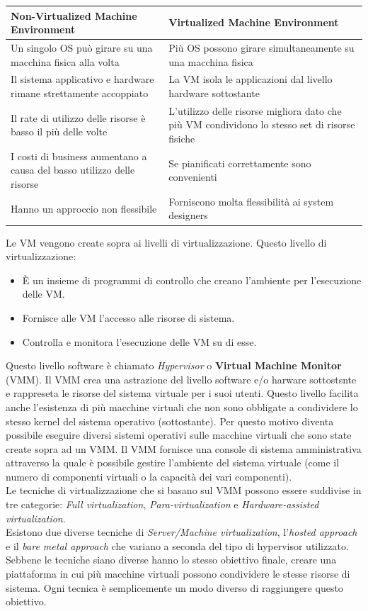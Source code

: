 \documentclass{article}
\begin{document}
\begin{table}[H]
    \begin{tabularx}{\linewidth}{X | X}
    \hline
    \textbf{Non-Virtualized Machine Environment} & \textbf{Virtualized Machine Environment}\\ [0.5ex]
    \hline\hline
    Un singolo OS può girare su una macchina fisica alla volta &
    Più OS possono girare simultaneamente su una macchina fisica \\
    \hline
    Il sistema applicativo e hardware rimane strettamente accoppiato &
    La VM isola le applicazioni dal livello hardware sottostante \\
    \hline
    Il rate di utilizzo delle risorse è basso il più delle volte & 
    L'utilizzo delle risorse migliora dato che più VM condividono lo stesso set di risorse fisiche \\
    \hline
    I costi di business aumentano a causa del basso utilizzo delle risorse & Se pianificati correttamente sono convenienti \\
    \hline
    Hanno un approccio non flessibile & 
    Forniscono molta flessibilità ai system designers\\ [1ex] 
    \hline
    \end{tabularx}
\end{table}
Le VM vengono create sopra ai livelli di virtualizzazione. Questo livello di virtualizzazione:
\begin{itemize}
    \item È un insieme di programmi di controllo che creano l'ambiente per l'esecuzione delle VM.
    \item Fornisce alle VM l'accesso alle risorse di sistema.
    \item Controlla e monitora l'esecuzione delle VM su di esse. 
\end{itemize}
Questo livello software è chiamato \textit{Hypervisor} o \textbf{Virtual Machine Monitor} (VMM). Il VMM crea una astrazione del livello software e/o harware sottostsnte e rappreseta le risorse del sistema virtuale per i suoi utenti. Questo livello facilita anche l’esistenza di più macchine virtuali che non sono obbligate a condividere lo stesso kernel del sistema operativo (sottostante). Per questo motivo diventa possibile eseguire diversi sistemi operativi sulle macchine virtuali che sono state create sopra ad un VMM. Il VMM fornisce una console di sistema amministrativa attraverso la quale è possibile gestire l’ambiente del sistema virtuale (come il numero di componenti virtuali o la capacità dei vari componenti). \\
Le tecniche di virtualizzazione che si basano sul VMM possono essere suddivise in tre categorie: \textit{Full virtualization}, \textit{Para-virtualization} e \textit{Hardware-assisted virtualization}. \\
Esistono due diverse tecniche di \textit{Server/Machine virtualization}, l’\textit{hosted approach} e il \textit{bare metal approach} che variano a seconda del tipo di hypervisor utilizzato. Sebbene le tecniche siano diverse hanno lo stesso obiettivo finale, creare una piattaforma in cui più macchine virtuali possono condividere le stesse risorse di sistema. Ogni tecnica è semplicemente un modo diverso di raggiungere questo obiettivo.
\end{document}
